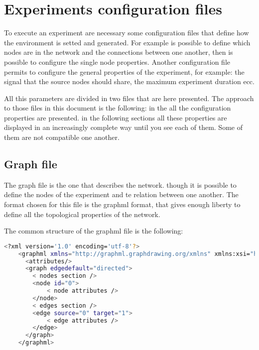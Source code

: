 \documentclass[10pt,journal,onecolumn]{IEEEtran}
\begin{document}
\section{Experiments configuration files}
\label{sec:exp_conf}

To execute an experiment are necessary some configuration files that define how
the environment is setted and generated.
For example is possible to define which nodes are in the network and the connections
between one another, then is possible to configure the single node properties.
Another configuration file permits to configure the general properties of the
experiment, for example: the signal that the source nodes should share, the 
maximum experiment duration ecc.

All this parameters are divided in two files that are here presented.
The approach to those files in this document is the following:
in the  all the configuration properties
are presented.
in the following sections all these properties are displayed in an 
increasingly complete way until you see each of them.
Some of them are not compatible one another.

\subsection{Graph file}
\label{subsec:graph_file}

The graph file is the one that describes the network. though it is possible
to define the nodes of the experiment and te relation between one another.
The format chosen for this file is the graphml format, that gives enough liberty
to define all the topological properties of the network.

The common structure of the graphml file is the following:
\begin{lstlisting}[language=bash]
	<?xml version='1.0' encoding='utf-8'?>
	<graphml xmlns="http://graphml.graphdrawing.org/xmlns" xmlns:xsi="http://www.w3.org/2001/XMLSchema-instance" xsi:schemaLocation="http://graphml.graphdr    awing.org/xmlns http://graphml.graphdrawing.org/xmlns/1.0/graphml.xsd">
	  <attributes/>
	  <graph edgedefault="directed">
		< nodes section />
	    <node id="0">
			< node attributes />
	    </node>
		< edges section />
	    <edge source="0" target="1">
			< edge attributes />
	    </edge>
	  </graph>
	</graphml> 
\end{lstlisting}
\end{document}
